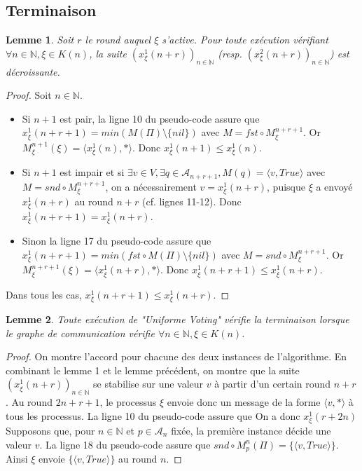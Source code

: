 \documentclass{article}
\newtheorem{lemma}{Lemme}
\begin{document}
\subsection{Terminaison}

	\begin{lemma}
		Soit $r$ le round auquel $\xi$ s'active.
		Pour toute exécution vérifiant $\forall n \in \mathds{N}, \xi \in K(n)$,
		la suite $(x^1_\xi(n+r))_{n \in \mathds{N}}$ (resp. $(x^2_\xi(n+r))_{n \in \mathds{N}}$) est décroissante.
	\end{lemma}
	\begin{proof}
		Soit $n \in \mathds{N}$.
		\begin{itemize}

			\item Si $n+1$ est pair, la ligne 10 du pseudo-code assure que $x^1_\xi(n+r+1) = min(M(\Pi) \setminus \{nil\})$ avec $M = fst \circ M_\xi^{n+r+1}$.
				Or $M_\xi^{n+1}(\xi) = \langle x^1_\xi(n), * \rangle$.
				Donc $x^1_\xi(n+1) \leq x^1_\xi(n)$.
			\item Si $n+1$ est impair et si $\exists v \in V, \exists q \in \mathcal{A}_{n+r+1}, M(q) = \langle v, True \rangle$ avec $M = snd \circ M_\xi^{n+r+1}$,
				on a nécessairement $v = x^1_\xi(n+r)$, puisque $\xi$ a envoyé $x^1_\xi(n+r)$ au round $n+r$ (cf. lignes 11-12).
				Donc $x^1_\xi(n+r+1) = x^1_\xi(n+r)$.
			\item Sinon la ligne 17 du pseudo-code assure que $x^1_\xi(n+r+1) = min(fst \circ M(\Pi) \setminus \{nil\})$ avec $M = snd \circ M_\xi^{n+r+1}$.
				Or $M_\xi^{n+r+1}(\xi) = \langle x^1_\xi(n+r), * \rangle$.
				Donc $x^1_\xi(n+r+1) \leq x^1_\xi(n+r)$.

		\end{itemize}
		Dans tous les cas, $x^1_\xi(n+r+1) \leq x^1_\xi(n+r)$.
	\end{proof}
		

	\begin{lemma}
		Toute exécution de "Uniforme Voting" vérifie la terminaison lorsque le graphe de communication vérifie $\forall n \in \mathds{N}, \xi \in K(n)$.
	\end{lemma}
	\begin{proof}
		On montre l'accord pour chacune des deux instances de l'algorithme.
		En combinant le lemme 1 et le lemme précédent, on montre que la suite $(x^1_\xi(n+r))_{n \in \mathds{N}}$ se stabilise sur une valeur $v$ à partir d'un certain round $n+r$.
		Au round $2n+r+1$, le processus $\xi$ envoie donc un message de la forme $\langle v, * \rangle$ à tous les processus.
		La ligne 10 du pseudo-code assure que
		On a donc $x^1_\xi(r+2n)$
		Supposons que, pour $n \in \mathds{N}$ et $p \in \mathcal{A}_n$ fixée, la première instance décide une valeur $v$.
		La ligne 18 du pseudo-code assure que $snd \circ M_p^n(\Pi) = \{\langle v, True \rangle\}$.
		Ainsi $\xi$ envoie $\{\langle v, True \rangle\}$ au round $n$.





	\end{proof}
\end{document}
